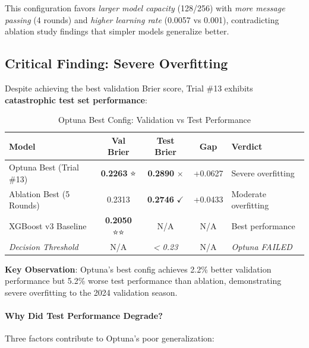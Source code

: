 This configuration favors \textit{larger model capacity} (128/256) with \textit{more message passing} (4 rounds) and \textit{higher learning rate} (0.0057 vs 0.001), contradicting ablation study findings that simpler models generalize better.

\subsection{Critical Finding: Severe Overfitting}
\label{subsec:optuna_overfitting}

Despite achieving the best validation Brier score, Trial \#13 exhibits \textbf{catastrophic test set performance}:

\begin{table}[htbp]
\centering
\caption{Optuna Best Config: Validation vs Test Performance}
\label{tab:optuna_val_test_comparison}
\small
\begin{tabular}{@{}lcccl@{}}
\toprule
\textbf{Model} & \textbf{Val Brier} & \textbf{Test Brier} & \textbf{Gap} & \textbf{Verdict} \\
\midrule
Optuna Best (Trial \#13) & \textbf{0.2263} ⭐ & \textbf{0.2890} $\times$ & +0.0627 & Severe overfitting \\
Ablation Best (5 Rounds) & 0.2313 & \textbf{0.2746} $\checkmark$ & +0.0433 & Moderate overfitting \\
XGBoost v3 Baseline & \textbf{0.2050} ⭐⭐ & N/A & N/A & Best performance \\
\textit{Decision Threshold} & N/A & \textit{< 0.23} & N/A & \textit{Optuna FAILED} \\
\bottomrule
\end{tabular}

\vspace{0.5em}
\footnotesize
\textbf{Key Observation}: Optuna's best config achieves 2.2\% better validation performance but 5.2\% worse test performance than ablation, demonstrating severe overfitting to the 2024 validation season.
\end{table}

\paragraph{Why Did Test Performance Degrade?}

Three factors contribute to Optuna's poor generalization:

